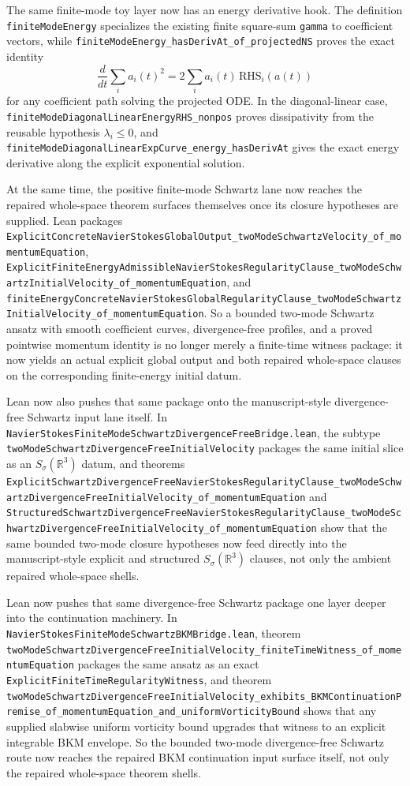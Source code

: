 \documentclass[11pt]{article}
\theoremstyle{remark}
\begin{document}
The same finite-mode toy layer now has an energy derivative hook.  The
definition \texttt{finiteModeEnergy} specializes the existing finite square-sum
\texttt{gamma} to coefficient vectors, while
\texttt{finiteModeEnergy\_hasDerivAt\_of\_projectedNS} proves the exact
identity
\[
  \frac{d}{dt}\sum_i a_i(t)^2 =
    2\sum_i a_i(t)\,\mathrm{RHS}_i(a(t))
\]
for any coefficient path solving the projected ODE.  In the diagonal-linear
case, \texttt{finiteModeDiagonalLinearEnergyRHS\_nonpos} proves dissipativity
from the reusable hypothesis \(\lambda_i\le 0\), and
\texttt{finiteModeDiagonalLinearExpCurve\_energy\_hasDerivAt} gives the exact
energy derivative along the explicit exponential solution.

At the same time, the positive finite-mode Schwartz lane now reaches the
repaired whole-space theorem surfaces themselves once its closure hypotheses are
supplied.  Lean packages
\texttt{ExplicitConcreteNavierStokesGlobalOutput\_twoModeSchwartzVelocity\_of\_momentumEquation},
\texttt{ExplicitFiniteEnergyAdmissibleNavierStokesRegularityClause\_twoModeSchwartzInitialVelocity\_of\_momentumEquation},
and
\texttt{finiteEnergyConcreteNavierStokesGlobalRegularityClause\_twoModeSchwartzInitialVelocity\_of\_momentumEquation}.
So a bounded two-mode Schwartz ansatz with smooth coefficient curves,
divergence-free profiles, and a proved pointwise momentum identity is no longer
merely a finite-time witness package: it now yields an actual explicit global
output and both repaired whole-space clauses on the corresponding finite-energy
initial datum.

Lean now also pushes that same package onto the manuscript-style divergence-free
Schwartz input lane itself.  In
\texttt{NavierStokesFiniteModeSchwartzDivergenceFreeBridge.lean}, the subtype
\texttt{twoModeSchwartzDivergenceFreeInitialVelocity} packages the same initial
slice as an $S_\sigma(\mathbb{R}^3)$ datum, and theorems
\texttt{ExplicitSchwartzDivergenceFreeNavierStokesRegularityClause\_twoModeSchwartzDivergenceFreeInitialVelocity\_of\_momentumEquation}
and
\texttt{StructuredSchwartzDivergenceFreeNavierStokesRegularityClause\_twoModeSchwartzDivergenceFreeInitialVelocity\_of\_momentumEquation}
show that the same bounded two-mode closure hypotheses now feed directly into
the manuscript-style explicit and structured $S_\sigma(\mathbb{R}^3)$ clauses, not
only the ambient repaired whole-space shells.

Lean now pushes that same divergence-free Schwartz package one layer deeper
into the continuation machinery.  In
\texttt{NavierStokesFiniteModeSchwartzBKMBridge.lean}, theorem
\texttt{twoModeSchwartzDivergenceFreeInitialVelocity\_finiteTimeWitness\_of\_momentumEquation}
packages the same ansatz as an exact
\texttt{ExplicitFiniteTimeRegularityWitness}, and theorem
\texttt{twoModeSchwartzDivergenceFreeInitialVelocity\_exhibits\_BKMContinuationPremise\_of\_momentumEquation\_and\_uniformVorticityBound}
shows that any supplied slabwise uniform vorticity bound upgrades that witness
to an explicit integrable BKM envelope.  So the bounded two-mode
divergence-free Schwartz route now reaches the repaired BKM continuation input
surface itself, not only the repaired whole-space theorem shells.
\end{document}
